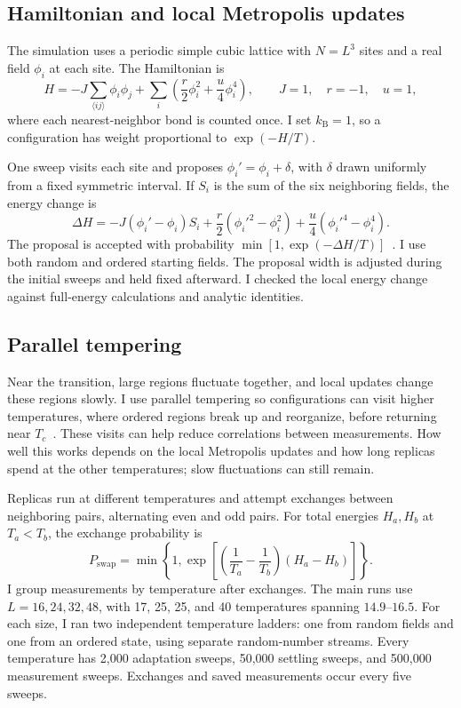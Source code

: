 \documentclass[11pt,letterpaper]{article}
\begin{document}
\subsection{Hamiltonian and local Metropolis updates}
The simulation uses a periodic simple cubic lattice with $N=L^3$ sites and
a real field $\phi_i$ at each site. The Hamiltonian is
\begin{equation}
H=-J\sum_{\langle ij\rangle}\phi_i\phi_j+
 \sum_i\left(\frac r2\phi_i^2+\frac u4\phi_i^4\right),
\qquad J=1,\quad r=-1,\quad u=1,
\label{eq:H}
\end{equation}
where each nearest-neighbor bond is counted once. I set $k_{\mathrm B}=1$,
so a configuration has weight proportional to $\exp(-H/T)$.

One sweep visits each site and proposes
$\phi_i'=\phi_i+\delta$, with $\delta$ drawn uniformly from a fixed symmetric
interval. If $S_i$ is the sum of the six neighboring fields, the energy
change is
\begin{equation}
\Delta H=-J(\phi_i'-\phi_i)S_i+
 \frac r2(\phi_i'^2-\phi_i^2)+\frac u4(\phi_i'^4-\phi_i^4).
\end{equation}
The proposal is accepted with probability
$\min[1,\exp(-\Delta H/T)]$~\cite{metropolis}.
I use both random and ordered starting fields. The proposal width is
adjusted during the initial sweeps and held fixed afterward. I checked
the local energy change against full-energy calculations and analytic
identities.

\newpage
\subsection{Parallel tempering}
Near the transition, large regions fluctuate together, and local updates
change these regions slowly. I use parallel tempering so configurations
can visit higher temperatures, where ordered regions break up and
reorganize, before returning near $T_c$~\cite{earl}. These visits can
help reduce correlations between measurements. How well this works
depends on the local Metropolis updates and how long replicas spend
at the other temperatures; slow fluctuations can still remain.

Replicas run at different temperatures and attempt exchanges between
neighboring pairs, alternating even and odd pairs. For total energies
$H_a,H_b$ at $T_a<T_b$, the exchange probability is
\begin{equation}
P_{\mathrm{swap}}=\min\!\left\{1,
 \exp\left[\left(\frac{1}{T_a}-\frac{1}{T_b}\right)(H_a-H_b)\right]\right\}.
\end{equation}
I group measurements by temperature after exchanges. The main runs use
$L=16,24,32,48$, with 17, 25, 25, and 40 temperatures spanning
$14.9$--$16.5$. For each size, I ran two independent temperature ladders:
one from random fields and one from an ordered state, using separate
random-number streams. Every temperature has 2,000 adaptation sweeps,
50,000 settling sweeps, and 500,000 measurement sweeps. Exchanges and saved
measurements occur every five sweeps.
\end{document}
